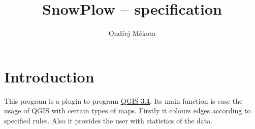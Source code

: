 \documentclass[12pt,a4paper]{article}
\begin{document}
\title{SnowPlow – specification}
\author{Ondřej Měkota}

\maketitle
\pagebreak
\section{Introduction}

\par This program is a plugin to program \href{https://qgis.org/en/site/index.html}{QGIS 3.4}. 
Its main function is ease the usage of QGIS with certain types of maps.
Firstly it colours edges according to specified rules.
Also it provides the user with statistics of the data.
\end{document}
